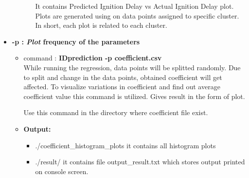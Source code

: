 \documentclass[12pt]{article}
\begin{document}
\begin{itemize}[wide = 0pt, labelwidth = 1.3333em, labelsep = 0.3333em, leftmargin = \dimexpr{} + \relax ]
\begin{itemize}
\begin{itemize}
					It contains Predicted Ignition Delay vs Actual Ignition Delay plot. Plots are generated using on data points assigned to specific cluster. In short, each plot is related to each cluster.
				\end{itemize}
			
				
			\end{itemize}
			
			\newpage
			
			\item \textbf{-p : \textit{Plot} frequency of the  parameters} \\
		
			\begin{itemize}

				\item command : \textbf{IDprediction -p coefficient.csv} \\
				
				\subitem While running the regression, data points will be splitted randomly. Due to split and change in the data points, obtained coefficient will get affected. To visualize variations in coefficient and find out average coefficient value this command is utilized. Gives result in the form of plot.
				
				Use this command in the directory where coefficient file exist.
			\item \textbf{Output:}
			\begin{itemize}
				\item ./coefficient\_histogram\_plots
				\subitem it contains all histogram plots
				
				\item ./result/
				\subitem  it contains file output\_result.txt which stores output printed on console screen.
			\end{itemize}
			\end{itemize}
			
			
			\end{itemize}

		
\end{document}
